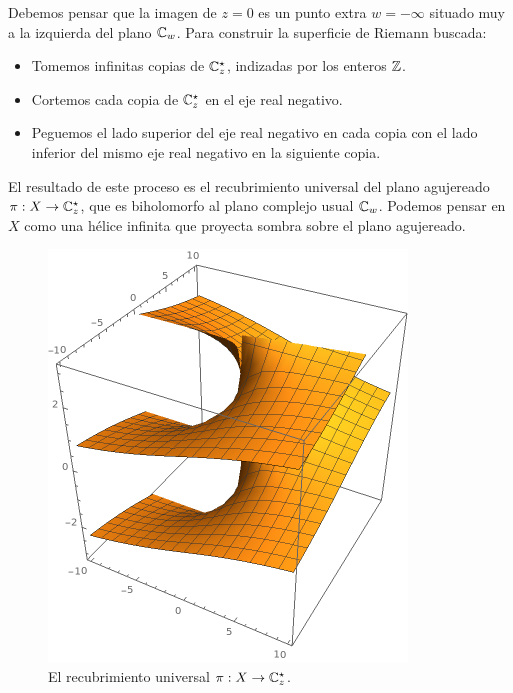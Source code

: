 \begin{solution}
\begin{itemize}
\begin{enumerate}[label=\alph*)]
        Debemos pensar que la imagen de $z = 0$ es un punto extra $w = -\infty$ situado muy a la izquierda del plano $\mathbb C_w$. Para construir la superficie de Riemann buscada:
        \begin{itemize}
            \item Tomemos infinitas copias de $\mathbb C_z^\star$, indizadas por los enteros $\mathbb Z$.
            \item Cortemos cada copia de $\mathbb C_z^\star$ en el eje real negativo.
            \item Peguemos el lado superior del eje real negativo en cada copia con el lado inferior del mismo eje real negativo en la siguiente copia.
        \end{itemize}
        
        El resultado de este proceso es el recubrimiento universal del plano agujereado $\pi : X \to \mathbb C_z^\star$, que es biholomorfo al plano complejo usual $\mathbb C_w$. Podemos pensar en $X$ como una hélice infinita que proyecta sombra sobre el plano agujereado.
        \begin{figure}[h]
            \centering
            \includegraphics[scale=0.5]{ramification/5-helix.png}
            \caption{El recubrimiento universal $\pi : X \to \mathbb C_z^\star$.}
        \end{figure}
        

\end{enumerate}
\end{itemize}
\end{solution}
